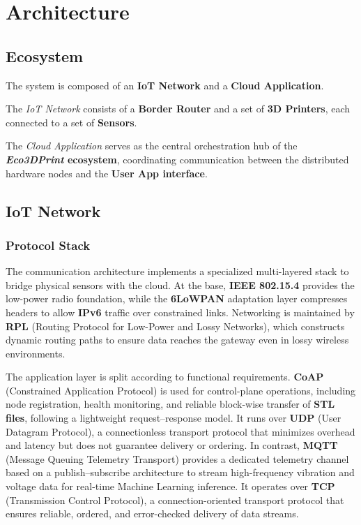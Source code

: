 \chapter{Architecture}
\section{Ecosystem}
The system is composed of an \textbf{IoT Network} and a \textbf{Cloud Application}. 

The \textit{IoT Network} consists of a \textbf{Border Router} and a set of \textbf{3D Printers}, each connected to a set of \textbf{Sensors}.

The \textit{Cloud Application} serves as the central orchestration hub of the \textbf{\textit{Eco3DPrint} ecosystem}, coordinating communication between the distributed hardware nodes and the \textbf{User App interface}. 

\section{IoT Network}
\subsection{Protocol Stack}
The communication architecture implements a specialized multi-layered stack to bridge physical sensors with the cloud. At the base, \textbf{IEEE 802.15.4} provides the low-power radio foundation, while the \textbf{6LoWPAN} adaptation layer compresses headers to allow \textbf{IPv6} traffic over constrained links. Networking is maintained by \textbf{RPL} (Routing Protocol for Low-Power and Lossy Networks), which constructs dynamic routing paths to ensure data reaches the gateway even in lossy wireless environments.

\medspace

The application layer is split according to functional requirements. \textbf{CoAP} (Constrained Application Protocol) is used for control-plane operations, including node registration, health monitoring, and reliable block-wise transfer of \textbf{STL files}, following a lightweight request–response model. It runs over \textbf{UDP} (User Datagram Protocol), a connectionless transport protocol that minimizes overhead and latency but does not guarantee delivery or ordering. In contrast, \textbf{MQTT} (Message Queuing Telemetry Transport) provides a dedicated telemetry channel based on a publish–subscribe architecture to stream high-frequency vibration and voltage data for real-time Machine Learning inference. It operates over \textbf{TCP} (Transmission Control Protocol), a connection-oriented transport protocol that ensures reliable, ordered, and error-checked delivery of data streams. 

